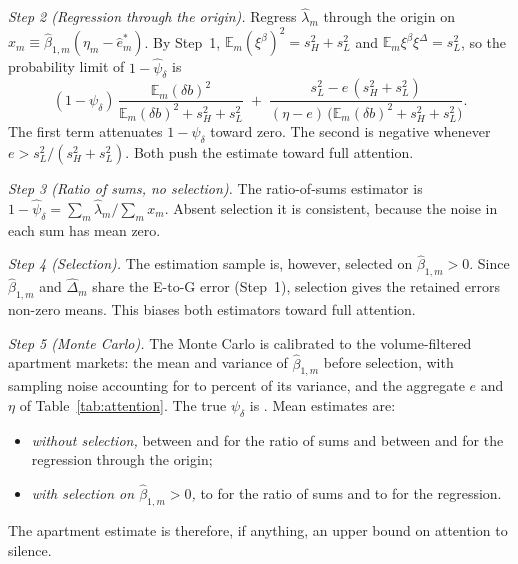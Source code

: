 \emph{Step 2 (Regression through the origin).} Regress $\hat\lambda_m$ through the origin on $x_m\equiv\hat\beta_{1,m}(\eta_m-\hat e^*_m)$. By Step~1, $\mathbb E_m(\xi^\beta)^2=s_H^2+s_L^2$ and $\mathbb E_m\xi^\beta\xi^\Delta=s_L^2$, so the probability limit of $1-\hat\psi_\delta$ is
\begin{equation*}
    (1-\psi_\delta)\,\frac{\mathbb E_m(\delta b)^2}{\mathbb E_m(\delta b)^2+s_H^2+s_L^2}\;+\;\frac{s_L^2-e\,(s_H^2+s_L^2)}{(\eta-e)\,\big(\mathbb E_m(\delta b)^2+s_H^2+s_L^2\big)}.
\end{equation*}
The first term attenuates $1-\psi_\delta$ toward zero. The second is negative whenever $e>s_L^2/(s_H^2+s_L^2)$. Both push the estimate toward full attention.

\emph{Step 3 (Ratio of sums, no selection).} The ratio-of-sums estimator is $1-\hat\psi_\delta=\sum_m\hat\lambda_m/\sum_mx_m$. Absent selection it is consistent, because the noise in each sum has mean zero.

\emph{Step 4 (Selection).} The estimation sample is, however, selected on $\hat\beta_{1,m}>0$. Since $\hat\beta_{1,m}$ and $\hat\Delta_m$ share the E-to-G error (Step~1), selection gives the retained errors non-zero means. This biases both estimators toward full attention.

\emph{Step 5 (Monte Carlo).} The Monte Carlo is calibrated to the \attMCmarkets{} volume-filtered apartment markets: the mean and variance of $\hat\beta_{1,m}$ before selection, with sampling noise accounting for \attMCshareLo{} to \attMCshareHi{} percent of its variance, and the aggregate $e$ and $\eta$ of Table~\ref{tab:attention}. The true $\psi_\delta$ is \attMCtrue{}. Mean estimates are:
\begin{itemize}
    \item \emph{without selection,} between \attMCromLo{} and \attMCromHi{} for the ratio of sums and between \attMColsLo{} and \attMColsHi{} for the regression through the origin;
    \item \emph{with selection on $\hat\beta_{1,m}>0$,} \attMCromSelLo{} to \attMCromSelHi{} for the ratio of sums and \attMColsSelLo{} to \attMColsSelHi{} for the regression.
\end{itemize}
The apartment estimate is therefore, if anything, an upper bound on attention to silence.

